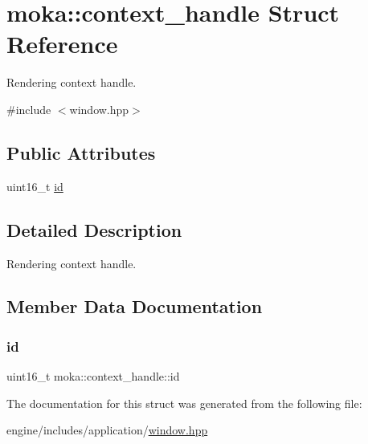 \hypertarget{structmoka_1_1context__handle}{}\section{moka\+::context\+\_\+handle Struct Reference}
\label{structmoka_1_1context__handle}


Rendering context handle.  




{\ttfamily \#include $<$window.\+hpp$>$}

\subsection*{Public Attributes}
\begin{DoxyCompactItemize}
\item 
uint16\+\_\+t \mbox{\hyperlink{structmoka_1_1context__handle_a73f326eb8d642eb04404fc8d83a001a3}{id}}
\end{DoxyCompactItemize}


\subsection{Detailed Description}
Rendering context handle. 

\subsection{Member Data Documentation}
\mbox{\label{structmoka_1_1context__handle_a73f326eb8d642eb04404fc8d83a001a3}} 
\subsubsection{\texorpdfstring{id}{id}}
{\footnotesize\ttfamily uint16\+\_\+t moka\+::context\+\_\+handle\+::id}



The documentation for this struct was generated from the following file\+:\begin{DoxyCompactItemize}
\item 
engine/includes/application/\mbox{\hyperlink{window_8hpp}{window.\+hpp}}\end{DoxyCompactItemize}
